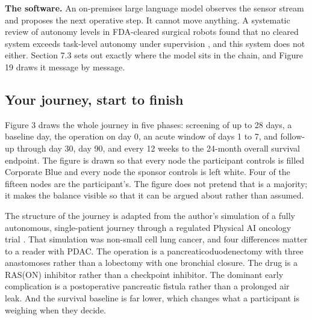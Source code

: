 \textbf{The software.} An on-premises large language model observes the sensor
stream and proposes the next operative step. It cannot move anything. A
systematic review of autonomy levels in FDA-cleared surgical robots found that
no cleared system exceeds task-level autonomy under supervision
\cite{LeeAuto2024X}, and this system does not either. Section 7.3 sets out
exactly where the model sits in the chain, and Figure 19 draws it message by
message.

\subsection{Your journey, start to finish}

Figure 3 draws the whole journey in five phases: screening of up to 28 days, a
baseline day, the operation on day 0, an acute window of days 1 to 7, and
follow-up through day 30, day 90, and every 12 weeks to the 24-month overall
survival endpoint. The figure is drawn so that every node the participant
controls is filled Corporate Blue and every node the sponsor controls is left
white. Four of the fifteen nodes are the participant's. The figure does not
pretend that is a majority; it makes the balance visible so that it can be
argued about rather than assumed.

The structure of the journey is adapted from the author's simulation of a fully
autonomous, single-patient journey through a regulated Physical AI oncology
trial \cite{paipatientjr}. That simulation was non-small cell lung cancer, and
four differences matter to a reader with PDAC. The operation is a
pancreaticoduodenectomy with three anastomoses rather than a lobectomy with one
bronchial closure. The drug is a RAS(ON) inhibitor rather than a checkpoint
inhibitor. The dominant early complication is a postoperative pancreatic fistula
rather than a prolonged air leak. And the survival baseline is far lower, which
changes what a participant is weighing when they decide.

